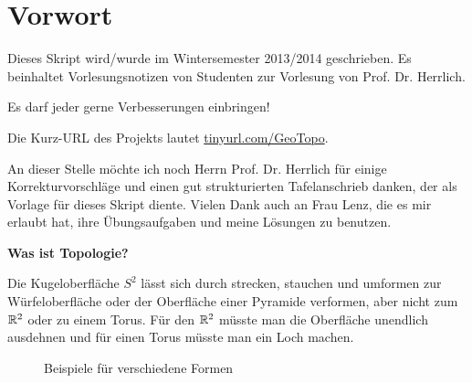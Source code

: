 \chapter*{Vorwort}
Dieses Skript wird/wurde im Wintersemester 2013/2014 geschrieben.
Es beinhaltet Vorlesungsnotizen von Studenten zur Vorlesung von
Prof. Dr. Herrlich.

Es darf jeder gerne Verbesserungen einbringen!

Die Kurz-URL des Projekts lautet \href{http://tinyurl.com/GeoTopo}{tinyurl.com/GeoTopo}.

An dieser Stelle möchte ich noch Herrn Prof. Dr. Herrlich 
für einige Korrekturvorschläge und einen gut strukturierten 
Tafelanschrieb danken, der als Vorlage für dieses Skript diente.
Vielen Dank auch an Frau Lenz, die es mir erlaubt hat, ihre 
Übungsaufgaben und meine Lösungen zu benutzen.


\textbf{Was ist Topologie?}

Die Kugeloberfläche $S^2$ lässt sich durch strecken, stauchen
und umformen zur Würfeloberfläche oder
der Oberfläche einer Pyramide verformen, aber nicht zum $\mdr^2$
oder zu einem Torus. Für den $\mdr^2$ müsste man die Oberfläche
unendlich ausdehnen und für einen Torus müsste man ein Loch machen.

\begin{figure}[ht]
    \centering
    \subfigure[$S^2$]{
        
        \label{fig:s2}
    }%
    \subfigure[Würfel]{
        
        \label{fig:cube}
    }%
    \subfigure[Pyramide]{
        
        \label{fig:pyramide}
    }

    \subfigure[$\mdr^2$]{
        
        \label{fig:plane-r2}
    }%
    \label{Formen}
    \caption{Beispiele für verschiedene Formen}
\end{figure}

